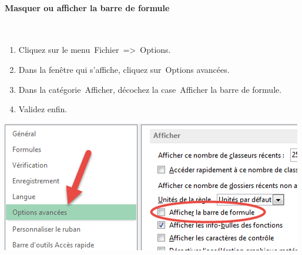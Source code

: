 \paragraph{Masquer ou afficher la barre de formule}{\hfill\\
 	\begin{enumerate}
 		\item Cliquez sur le menu Fichier => Options.
 		\item Dans la fenêtre qui s’affiche, cliquez sur Options avancées.
 		\item Dans la catégorie Afficher, décochez la case Afficher la barre de formule.
 		\item Validez enfin.
 	\end{enumerate}
 \begin{center} 
 	\includegraphics[scale=0.2,width=\linewidth]{img/Masquer_barre} 
 	 \label{rdp}
 \end{center}
}
